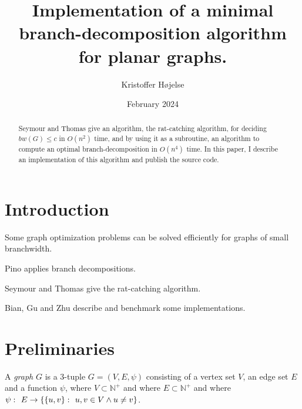 \documentclass{article}
\title{Implementation of a minimal branch-decomposition algorithm for planar graphs.}
\author{Kristoffer Højelse}
\date{February 2024}
\begin{document}
\maketitle


\begin{abstract}
	Seymour and Thomas give an algorithm, the rat-catching algorithm, for deciding $bw(G) \leq c$ in $O(n^2)$ time, and by using it as a subroutine, an algorithm to compute an optimal branch-decomposition in $O(n^4)$ time. In this paper, I describe an implementation of this algorithm and publish the source code.
\end{abstract}


\section{Introduction}
	Some graph optimization problems can be solved efficiently for graphs of small branchwidth.\cite{CNP+11}

	Pino\cite{Pin16} applies branch decompositions.

	Seymour and Thomas\cite{ST93} give the rat-catching algorithm.

	Bian, Gu and Zhu\cite{BGZ15} describe and benchmark some implementations.


\section{Preliminaries}

	A \textit{graph} $G$ is a 3-tuple $G = (V, E, \psi)$ consisting of a vertex set $V$, an edge set $E$ and a function $\psi$, where $V \subset \mathbb{N}^+$ and where $E \subset \mathbb{N}^+$ and where $\psi \,\colon\  E \to \{\{u,v\} \,\colon\  u,v \in V \land u \neq v \}$.
\end{document}
